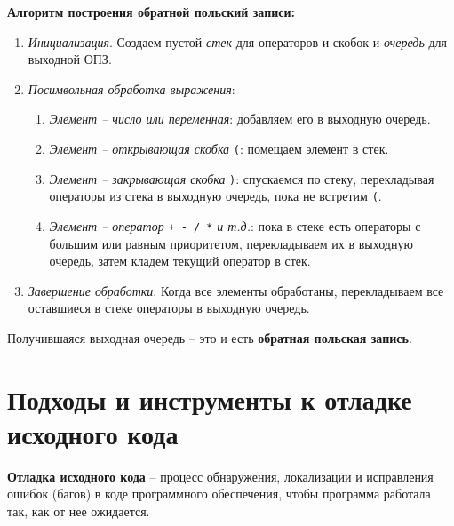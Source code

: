 \textbf{Алгоритм построения обратной польский записи:}
\begin{enumerate}[font=\footnotesize, noitemsep, topsep=0pt, , partopsep=0pt]
	\item {\footnotesize \textit{Инициализация}. Создаем пустой \textit{стек} для операторов и скобок и \textit{очередь} для выходной ОПЗ.}
	\item {\footnotesize \textit{Посимвольная обработка выражения}:}
	\begin{enumerate}[font=\footnotesize, noitemsep, topsep=0pt, , partopsep=0pt]
		\item {\footnotesize \textit{Элемент -- число или переменная}: добавляем его в выходную очередь.}
		\item {\footnotesize \textit{Элемент -- открывающая скобка} \verb|(|: помещаем элемент в стек.}
		\item {\footnotesize \textit{Элемент -- закрывающая скобка} \verb|)|: спускаемся по стеку, перекладывая операторы из стека в выходную очередь, пока не встретим \verb|(|.}
		\item {\footnotesize \textit{Элемент -- оператор} \verb|+ - / *| \textit{и т.д.}: пока в стеке есть операторы с большим или равным приоритетом, перекладываем их в выходную очередь, затем кладем текущий оператор в стек.}
	\end{enumerate}
	\item {\footnotesize \textit{Завершение обработки}. Когда все элементы обработаны, перекладываем все оставшиеся в стеке операторы в выходную очередь.}
\end{enumerate}
Получившаяся выходная очередь -- это и есть \textbf{обратная польская запись}.
\vspace{50pt}



\section{Подходы и инструменты к отладке исходного кода}

\textbf{Отладка исходного кода} -- процесс обнаружения, локализации и исправления ошибок (багов) в коде программного обеспечения, чтобы программа работала так, как от нее ожидается.
\vspace{5pt}

